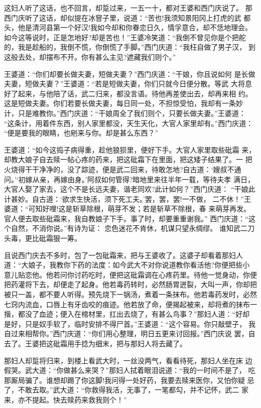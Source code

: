 这妇人听了这话，也不回言，却踅过来，一五一十，都对王婆和西门庆说了。
那西门庆听了这话，却似提在冰窨子里，说道：“苦也!我须知景阳冈上打虎的武
都头，他是清河县第一个好汉!我如今却和你眷恋日久，情孚意合，却不恁地理会。
如今这等说时，正是怎地好?却是苦也！”王婆冷笑道：“我倒不曾见你是个把舵
的，我是趁船的，我倒不慌，你倒慌了手脚。”西门庆道：“我枉自做了男子汉，
到这般去处，却摆布不开。你有甚么主见?遮藏我们则个。”

王婆道：“你们却要长做夫妻，短做夫妻？”西门庆道：“干娘，你且说如何
是长做夫妻，短做夫妻？”王婆道：“若是短做夫妻，你们只就今日便分散。等武
大将息好了起来，与他陪了话，武二归来，都没言语。待他再差使出去，却再来相
约。这是短做夫妻。你们若要长做夫妻，每日同一处，不担惊受怕，我却有一条妙
计，只是难教你。”西门庆道：“干娘周全了我们则个，只要长做夫妻。”王婆道：
“这条计，用着件东西，别人家里都没，天生天化，大官人家里却有。”西门庆道：
“便是要我的眼睛，也剜来与你。却是甚么东西？”

王婆道：“如今这捣子病得重，趁他狼狈里，便好下手。大官人家里取些砒霜
来，却教大娘子自去赎一帖心疼的药来，把这砒霜下在里面，把这矮子结果了。一
把火烧得干干净净的，没了踪迹，便是武二回来，待敢怎地?自古道：‘嫂叔不通
问。’‘初嫁从亲，再嫁由身。’阿叔如何管得?暗地里来往半年一载，等待夫孝
满日，大官人娶了家去，这个不是长远夫妻，谐老同欢?此计如何？”西门庆道：
“干娘此计甚妙。自古道：‘欲求生快活，须下死工夫。’罢，罢，罢!一不做，
二不休！”王婆道：“可知好哩!这是斩草除根，萌芽不发；若是斩草不除根，春
来萌芽再发。官人便去取些砒霜来，我自教娘子下手。事了时，却要重重谢我。”
西门庆道：“这个自然，不消你说。”有诗为证：
恋色迷花不肯休，机谋只望永绸缪。
谁知武二刀头毒，更比砒霜狠一筹。

且说西门庆去不多时，包了一包砒霜来，把与王婆收了。这婆子却看着那妇人
道：“大娘子，我教你下药的法度：如今武大不对你说道教你看活他?你便把些小
意儿贴恋他。他若问你讨药吃时，便把这砒霜调在心疼药里。待他一觉身动，你便
把药灌将下去，却便走了起身。他若毒药转时，必然肠胃迸裂，大叫一声，你却把
被只一盖，都不要人听得。预先烧下一锅汤，煮着一条抹布。他若毒药发时，必然
七窍内流血，口唇上有牙齿咬的痕迹。他若放了命，便揭起被来，却将煮的抹布一
揩，都没了血迹；便入在棺材里，扛出去烧了，有甚么鸟事？”那妇人道：“好却
是好，只是奴手软了，临时安排不得尸首。”王婆道：“这个容易。你只敲壁子，
我自过来相帮你。”西门庆道：“你们用心整理，明日五更来讨回报。”西门庆说
罢，自去了。王婆把这砒霜用手捻为细末，把与那妇人将去藏了。

那妇人却踅将归来，到楼上看武大时，一丝没两气，看看待死，那妇人坐在床
边假哭。武大道：“你做甚么来哭？”那妇人拭着眼泪说道：“我的一时间不是了，
吃那厮局骗了。谁想却踢了你这脚!我问得一处好药，我要去赎来医你，又怕你疑
忌了，不敢去取。”武大道：“你救得我活，无事了，一笔都勾，并不记怀，武二
家来，亦不提起。快去赎药来救我则个！”

